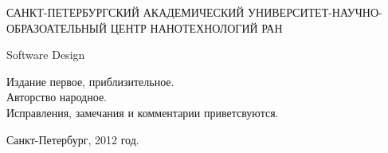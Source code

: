 \begin{titlepage}
\newpage

\begin{center}
САНКТ-ПЕТЕРБУРГСКИЙ АКАДЕМИЧЕСКИЙ УНИВЕРСИТЕТ-НАУЧНО-ОБРАЗОАТЕЛЬНЫЙ ЦЕНТР НАНОТЕХНОЛОГИЙ РАН
\end{center}
\hrulefill


\vspace{8em}

\begin{center}
\Large Software Design
\end{center}

\vspace{2.5em}

\begin{flushleft}
Издание первое, приблизительное. \\
Авторство народное. \\
Исправления, замечания и комментарии приветсвуются.
\end{flushleft}

\vspace{\fill}

\begin{center}
Санкт-Петербург, 2012 год.
\end{center}

\end{titlepage}
